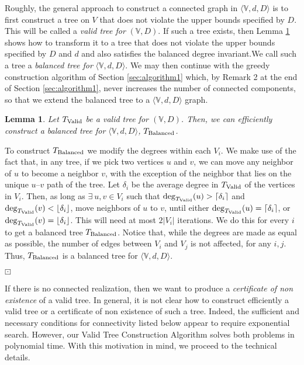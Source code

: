 \documentclass[12pt,a4paper]{article}
\theoremstyle{definition}
\theoremstyle{plain}
\newtheorem{lemma}[dfn]{Lemma}
\newenvironment{prf}{\noindent {\bf Proof.}}{\begin{flushright}\vspace{-2em}\footnotesize$\boxdot$\normalsize\end{flushright}\smallskip}
\begin{document}
Roughly, the general approach to construct
a connected graph in $\langle{\mathbb V},d,D\rangle$ is to first construct a tree
on $V$
that does not violate the upper bounds specified by $D$.
This will be called a \emph{{valid tree for}} $(\mathbb V, D)$.
If such a tree exists, then Lemma \ref{lem:3-1} shows how to transform it to a tree
that does not violate the upper bounds specified by $D$ and $d$  and also 
satisfies the balanced degree invariant.We call such a tree a \emph{balanced tree for}
$\langle{\mathbb V},d,D\rangle$.
We may then continue with the greedy construction algorithm 
of Section \ref{sec:algorithm1} which,
by Remark 2 at the end of Section \ref{sec:algorithm1}, 
never increases the number of connected components, so that we extend the balanced tree
to a $\langle{\mathbb V},d,D\rangle$ graph.
\begin{lemma}
\label{lem:3-1}
Let $T_{\rm Valid}$ be a valid tree for  $({\mathbb V},D)$.
Then, we can efficiently construct a balanced tree for $\langle{\mathbb V},d,D\rangle$,
 $T_{\rm Balanced}$.
\end{lemma}
\begin{prf}
To construct $T_{\rm Balanced}$ we modify the degrees within each $V_i$. 
We make use of the
fact that, in any tree, if we pick two vertices $u$ and $v$, we can
move any neighbor of $u$ to become a neighbor $v$, with the exception
of the neighbor that lies on the unique $u$--$v$ path of the tree. Let
${\delta}_i$ be the average degree in $T_{\rm Valid}$ of the vertices in
$V_i$. 
Then, as long as
$\exists\:u,v\in V_i$ such that 
${\rm deg}_{T_{\rm Valid}}(u)>\lceil {\delta}_i
\rceil$ and ${\rm deg}_{T_{\rm Valid}}(v) < \lfloor {\delta}_i \rfloor$,
move neighbors of $u$ to $v$, until either ${\rm deg}_{T_{\rm Valid}}(u)=\lceil
{\delta}_i \rceil$, or
${\rm deg}_{T_{\rm Valid}}(v)=\lfloor {\delta}_i \rfloor$. 
This will need at most
$2|V_i|$ iterations. We do this for every $i$ to get a balanced 
tree $T_{\rm Balanced }$.
Notice that, while the degrees are made as equal as possible, the
number of edges between $V_i$ and $V_j$ is not affected, for any $i,j$.
Thus, $T_{\rm Balanced}$ is a balanced tree for $\langle{\mathbb V},d,D\rangle$.
\end{prf}

If there is no connected realization, then we want to produce a
{\it certificate of non existence} of a valid tree.
In general, it is not clear how to construct efficiently a valid tree
or a certificate of non existence of such a tree.
Indeed, the sufficient and necessary conditions for connectivity
listed below appear to require exponential search.
However, our Valid Tree Construction Algorithm
solves both problems in polynomial time.
With this motivation in mind, we proceed to the technical details.
\end{document}
